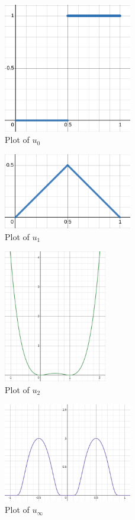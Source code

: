 \documentclass{article}
\begin{document}
\begin{figure}[ht]
\caption{Plot of $u_0$}
\centering
\includegraphics[width=0.5\textwidth]{u_0.png}
\end{figure}
\begin{figure}[ht]
\caption{Plot of $u_1$}
\centering
\includegraphics[width=0.5\textwidth]{u_1.png}
\end{figure}
\begin{figure}[ht]
\caption{Plot of $u_2$}
\centering
\includegraphics[width=0.4\textwidth]{u_2.png}
\end{figure}
\begin{figure}[ht]
\caption{Plot of $u_\infty$}
\centering
\includegraphics[width=0.5\textwidth]{u_inf.png}
\end{figure}
\newpage
\end{document}
